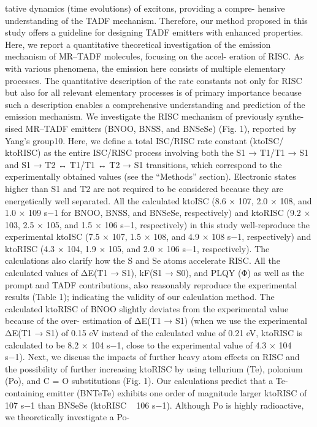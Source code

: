 tative dynamics (time evolutions) of excitons, providing a compre-
hensive understanding of the TADF mechanism. Therefore, our
method proposed in this study offers a guideline for designing TADF
emitters with enhanced properties.
Here, we report a quantitative theoretical investigation of the
emission mechanism of MR–TADF molecules, focusing on the accel-
eration of RISC. As with various phenomena, the emission here consists
of multiple elementary processes. The quantitative description of the
rate constants not only for RISC but also for all relevant elementary
processes is of primary importance because such a description enables
a comprehensive understanding and prediction of the emission
mechanism. We investigate the RISC mechanism of previously synthe-
sised MR–TADF emitters (BNOO, BNSS, and BNSeSe) (Fig. 1), reported
by Yang’s group10. Here, we deﬁne a total ISC/RISC rate constant (ktoISC/
ktoRISC) as the entire ISC/RISC process involving both the S1 → T1/T1 → S1
and S1 → T2 ↔ T1/T1 ↔ T2 → S1 transitions, which correspond to the
experimentally obtained values (see the “Methods” section). Electronic
states higher than S1 and T2 are not required to be considered because
they are energetically well separated. All the calculated ktoISC (8.6 × 107,
2.0 × 108, and 1.0 × 109 s−1 for BNOO, BNSS, and BNSeSe, respectively)
and ktoRISC (9.2 × 103, 2.5 × 105, and 1.5 × 106 s−1, respectively) in this study
well-reproduce
the
experimental
ktoISC
(7.5 × 107,
1.5 × 108,
and
4.9 × 108 s−1, respectively) and ktoRISC (4.3 × 104, 1.9 × 105, and 2.0 × 106 s−1,
respectively). The calculations also clarify how the S and Se atoms
accelerate RISC. All the calculated values of ΔE(T1 → S1), kF(S1 → S0),
and PLQY (Φ) as well as the prompt and TADF contributions, also
reasonably reproduce the experimental results (Table 1); indicating the
validity of our calculation method. The calculated ktoRISC of BNOO
slightly deviates from the experimental value because of the over-
estimation of ΔE(T1 → S1) (when we use the experimental ΔE(T1 → S1) of
0.15 eV instead of the calculated value of 0.21 eV, ktoRISC is calculated to
be 8.2 × 104 s−1, close to the experimental value of 4.3 × 104 s−1).
Next, we discuss the impacts of further heavy atom effects on
RISC and the possibility of further increasing ktoRISC by using tellurium
(Te), polonium (Po), and C = O substitutions (Fig. 1). Our calculations
predict that a Te-containing emitter (BNTeTe) exhibits one order of
magnitude larger ktoRISC of 107 s−1 than BNSeSe (ktoRISC ~ 106 s−1).
Although Po is highly radioactive, we theoretically investigate a Po-
